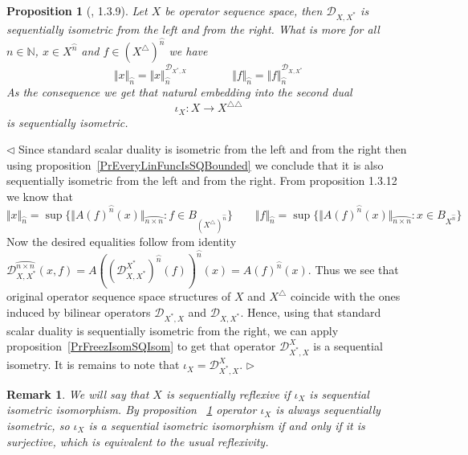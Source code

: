 \documentclass[12pt]{article}
\newtheorem{proposition}[theorem]{Proposition}
\newtheorem{remark}[theorem]{Remark}
\newenvironment{proof}{\par $\triangleleft$}{$\triangleright$}
\begin{document}
\begin{proposition}[\cite{LamOpFolgen}, 1.3.9]\label{PrSQNormsViaDuality}
Let $X$ be operator sequence space, then $\mathcal{D}_{X,X^*}$ is sequentially 
isometric from the left and from the right. What is more for all 
$n\in\mathbb{N}$, $x\in X^{\wideparen{n}}$ and 
$f\in {(X^\triangle)}^{\wideparen{n}}$ we have
$$
\Vert x\Vert_{\wideparen{n}} =\Vert x\Vert_{\wideparen{n}}^{\mathcal{D}_{X^*,X}}
\qquad\qquad \Vert f\Vert_{\wideparen{n}} =\Vert
f\Vert_{\wideparen{n}}^{\mathcal{D}_{X,X^*}}
$$
As the consequence we get that natural embedding into the second dual
$$
\iota_X:X\to X^{\triangle\triangle}
$$
is sequentially isometric.
\end{proposition}
\begin{proof}
Since standard scalar duality is isometric from the left and from the right then 
using proposition~\ref{PrEveryLinFuncIsSQBounded} we conclude that it is also 
sequentially isometric from the left and from the right. From proposition 1.3.12 
~\cite{LamOpFolgen} we know that
$$
\Vert x\Vert_{\wideparen{n}} =\sup \{\Vert
{A(f)}^{\wideparen{n}}(x)\Vert_{\wideparen{n\times n}}: f\in
B_{{(X^\triangle)}^{\wideparen{n}}} \}
\qquad
\Vert f\Vert_{\wideparen{n}} =\sup \{\Vert
{A(f)}^{\wideparen{n}}(x)\Vert_{\wideparen{n\times n}}:x\in
B_{X^{\wideparen{n}}} \}
$$
Now the desired equalities follow from identity 
$\mathcal{D}_{X,X^*}^{\wideparen{n\times n}}(x,f)
={A({(\mathcal{D}_{X,X^*}^{X^*})}^{\wideparen{n}}(f))}^{\wideparen{n}}(x)
={A(f)}^{\wideparen{n}}(x)$.
Thus we see that original operator sequence space structures of $X$ and 
$X^\triangle$ coincide with the ones induced by bilinear operators 
$\mathcal{D}_{X^*,X}$ and $\mathcal{D}_{X,X^*}$. Hence, using that standard 
scalar duality is sequentially isometric from the right, we can apply 
proposition~\ref{PrFreezIsomSQIsom} to get that operator 
$\mathcal{D}_{X^*,X}^X$ is a sequential isometry. It is remains to note that 
$\iota_X=\mathcal{D}_{X^*,X}^X$. 
\end{proof}

\begin{remark}\label{RemSqReflexiv} We will say that $X$ is sequentially 
reflexive if $\iota_X$ is sequential isometric isomorphism. By proposition 
~\ref{PrSQNormsViaDuality} operator $\iota_X$ is always sequentially 
isometric, so $\iota_X$ is a sequential isometric isomorphism if and only if 
it is surjective, which is equivalent to the usual reflexivity.
\end{remark}
\end{document}
